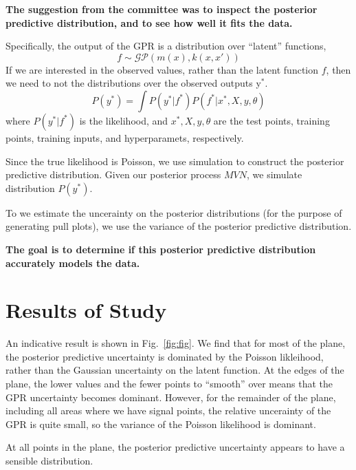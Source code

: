 \documentclass[12pt]{article}
\begin{document}
\textbf{The suggestion from the committee was to inspect the posterior predictive distribution, and to see how well it fits the data.
}

Specifically, the output of the GPR is a distribution over ``latent'' functions,
\begin{equation}
  f \sim \mathcal{GP} \left( m(x), k(x,x') \right) 
\end{equation}
If we are interested in the observed values, rather than the latent function $f$, then we need to not the distributions over the observed outputs y$^{*}$.
\begin{equation}
  P(y^{*}) = \int P(y^{*} | f^{*}) P(f^{*}| x^{*},X,y,\theta)
\end{equation}
where $P(y^{*} | f^{*}) $ is the likelihood, and $x^{*},X,y,\theta$ are the test points, training points, training inputs, and hyperparamets, respectively. 

Since the true likelihood is Poisson, we use simulation to construct the posterior predictive distribution.
Given our posterior process $MVN$, we simulate distribution $P(y^{*})$.

To we estimate the uncerainty on the posterior distributions (for the purpose of generating pull plots), we use the variance of the posterior predictive distribution. 

{\bfseries The goal is to determine if this posterior predictive distribution accurately models the data.}

\section{Results of Study}

An indicative result is shown in Fig.~\ref{fig:fig}.
We find that for most of the plane, the posterior predictive uncertainty is dominated by the Poisson likleihood, rather than the Gaussian uncertainty on the latent function.
At the edges of the plane, the lower values and the fewer points to ``smooth'' over means that the GPR uncertainty becomes dominant.
However, for the remainder of the plane, including all areas where we have signal points, the relative uncerainty of the GPR is quite small, so the variance of the Poisson likelihood is dominant.

At all points in the plane, the posterior predictive uncertainty appears to have a sensible distribution.
\end{document}
